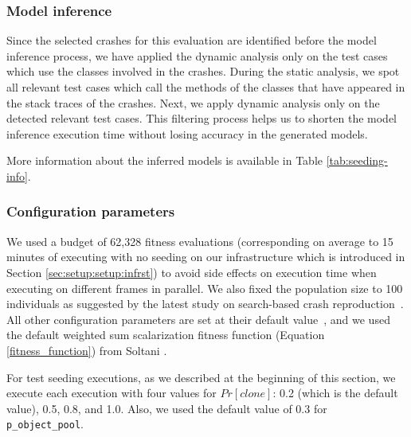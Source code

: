 \subsubsection{Model inference}
Since the selected crashes for this evaluation are identified before the model inference process, we have applied the dynamic analysis only on the test cases which use the classes involved in the crashes. During the static analysis, we spot all relevant test cases which call the methods of the classes that have appeared in the stack traces of the crashes. Next, we apply dynamic analysis only on the detected relevant test cases.
This filtering process helps us to shorten the model inference execution time without losing accuracy in the generated models.

More information about the inferred models is available in Table \ref{tab:seeding-info}.



\subsubsection{Configuration parameters}

We used a budget of 62,328 fitness evaluations (corresponding on average to 15 minutes of executing \botsing with no seeding on our infrastructure which is introduced in Section \ref{sec:setup:setup:infrst}) to avoid side effects on execution time when executing \botsing on different frames in parallel.
We also fixed the population size to 100 individuals as suggested by the latest study on search-based crash reproduction~\cite{Soltani2018b}.
All other configuration parameters are set at their default value~\cite{Rojas2016}, and we used the default weighted sum scalarization fitness function (Equation \ref{fitness_function}) from Soltani \etal \cite{Soltani2018b}.

For test seeding executions, as we described at the beginning of this section, we execute each execution with four values for $Pr[clone]$: 0.2 (which is the default value), 0.5, 0.8, and 1.0. Also, we used the default value of 0.3 for \texttt{p\_object\_pool}.

